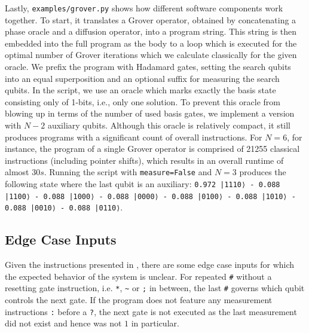 Lastly, \texttt{examples/grover.py} shows how different software components work together.
To start, it translates a \qiskit{} Grover operator, obtained by concatenating a phase oracle and a diffusion operator, into a \bfq{} program string.
This string is then embedded into the full \bfq{} program as the body to a loop which is executed for the optimal number of Grover iterations which we calculate classically for the given oracle.
We prefix the program with Hadamard gates, setting the search qubits into an equal superposition and an optional suffix for measuring the search qubits.
In the script, we use an oracle which marks exactly the basis state consisting only of 1-bits, i.e., only one solution.
To prevent this oracle from blowing up in terms of the number of used basis gates, we implement a version with $N-2$ auxiliary qubits.
Although this oracle is relatively compact, it still produces \bfq{} programs with a significant count of overall instructions.
For $N=6$, for instance, the \bfq{} program of a single Grover operator is comprised of 21255 classical instructions (including pointer shifts), which results in an overall runtime of almost $30s$.
Running the script with \texttt{measure=False} and $N=3$ produces the following state where the last qubit is an auxiliary: \texttt{0.972 |1110⟩ - 0.088 |1100⟩ - 0.088 |1000⟩ - 0.088 |0000⟩ - 0.088 |0100⟩ - 0.088 |1010⟩ - 0.088 |0010⟩ - 0.088 |0110⟩}.

\subsection{Edge Case Inputs}
\label{sec:approach-edge-cases}

Given the \bfq{} instructions presented in , there are some edge case inputs for which the expected behavior of the system is unclear.
For repeated \texttt{\#} without a resetting gate instruction, i.e. \texttt{*}, \texttt{\textasciitilde} or \texttt{;} in between, the last \texttt{\#} governs which qubit controls the next gate.
If the program does not feature any measurement instructions \texttt{:} before a \texttt{?}, the next gate is not executed as the last measurement did not exist and hence was not $1$ in particular.
